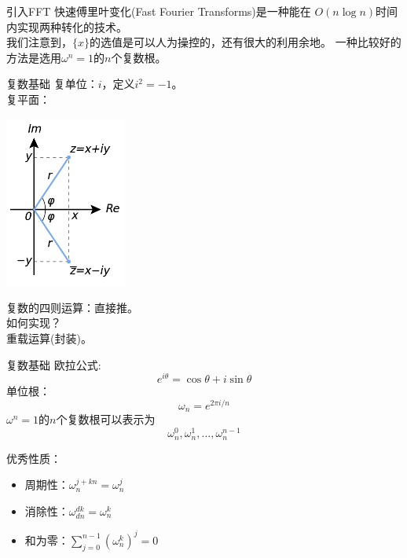 \documentclass[allowframebreaks,10pt]{beamer}
\begin{document}
\begin{frame}{引入FFT}
快速傅里叶变化(Fast Fourier Transforms)是一种能在
$O(n \log n)$时间内实现两种转化的技术。
\pause
\\ 我们注意到，$\{x\}$的选值是可以人为操控的，还有很大的利用余地。
\pause
一种比较好的方法是选用$\omega ^n = 1$的$n$个复数根。
\end{frame}

\begin{frame}{复数基础}
\pause
复单位：$i$，定义$i^2=-1$。 \\
\pause
复平面： \\
		\begin{center}
\includegraphics[width=0.3\textwidth]{300px-Complex_conjugate_picture.svg.png} \\
					   \end{center}
\pause
复数的四则运算：直接推。 \\
\pause
如何实现？\pause \\
重载运算(封装)。
\end{frame}

\begin{frame}{复数基础}
欧拉公式:
\[ e ^{i \theta } = \cos \theta + i \sin \theta \]
单位根：
\[ \omega_n = e ^ {2 \pi i / n}\]
\pause
$\omega ^ n = 1$的$n$个复数根可以表示为
\[ \omega_n^0, \omega_n^1, \ldots, \omega_n^{n-1}\]

\pause
优秀性质：
\begin{itemize}
\pause
\item 周期性：$\omega_n^{j+kn} = \omega_n^j$
\pause
\item 消除性：$\omega_{dn}^{dk} = \omega_n^k$
\pause
\item 和为零：$\sum_{j=0}^{n-1} (\omega_n^k)^j = 0$
\end{itemize}
\end{frame}
\end{document}
